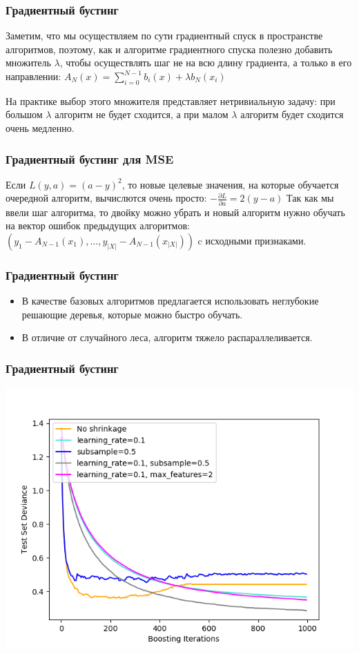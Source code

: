 \documentclass[14pt]{beamer}
\begin{document}
\begin{frame}
\frametitle{Градиентный бустинг}
    Заметим, что мы осуществляем по сути градиентный спуск в пространстве алгоритмов, поэтому, как и алгоритме градиентного спуска полезно добавить множитель $\lambda$, чтобы осуществлять шаг не на всю длину градиента, а только в его направлении:
    $A_{N}(x) = \sum\limits_{i=0}^{N - 1} b_i(x) + \lambda b_N(x_i)$
    
    На практике выбор этого множителя представляет нетривиальную задачу: при большом $\lambda$ алгоритм не будет сходится, а при малом $\lambda$ алгоритм будет сходится очень медленно.

\end{frame}

\begin{frame}
\frametitle{Градиентный бустинг для MSE}
    Если $L(y, a) = (a - y) ^ 2$, то новые целевые значения, на которые обучается очередной алгоритм, вычислются очень просто: 
    $- \frac{\partial L}{\partial a} = 2 (y - a) $ 
    Так как мы ввели шаг алгоритма, то двойку можно убрать и новый алгоритм нужно обучать на вектор ошибок предыдущих алгоритмов:
    $(y_1 - A_{N-1}(x_1), ..., y_{|X|} - A_{N-1}(x_{|X|}))$ c исходными признаками. 
    
\end{frame}

\begin{frame}
\frametitle{Градиентный бустинг}
    \begin{itemize}
        \item В качестве базовых алгоритмов предлагается использовать неглубокие решающие деревья, которые можно быстро обучать.
        \item В отличие от случайного леса, алгоритм тяжело распараллеливается.
    
    \end{itemize}
    
\end{frame}

\begin{frame}
\frametitle{Градиентный бустинг}
    \begin{center}
        \includegraphics[width=\textheight]{tree_gb.png}
    \end{center}
\end{frame}
\end{document}
